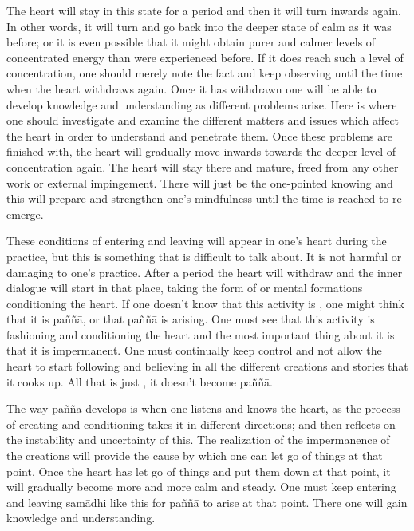 The heart will stay in this state for a period and then it will turn inwards again. In other words, it will turn and go back into the deeper state of calm as it was before; or it is even possible that it might obtain purer and calmer levels of concentrated energy than were experienced before. If it does reach such a level of concentration, one should merely note the fact and keep observing until the time when the heart withdraws again. Once it has withdrawn one will be able to develop knowledge and understanding as different problems arise. Here is where one should investigate and examine the different matters and issues which affect the heart in order to understand and penetrate them. Once these problems are finished with, the heart will gradually move inwards towards the deeper level of concentration again. The heart will stay there and mature, freed from any other work or external impingement. There will just be the one-pointed knowing and this will prepare and strengthen one's mindfulness  until the time is reached to re-emerge.

These conditions of entering and leaving will appear in one's heart during the practice, but this is something that is difficult to talk about. It is not harmful or damaging to one's practice. After a period the heart will withdraw and the inner dialogue will start in that place, taking the form of  or mental formations conditioning the heart. If one doesn't know that this activity is , one might think that it is pa\~n\~n\=a, or that pa\~n\~n\=a is arising. One must see that this activity is fashioning and conditioning the heart and the most important thing about it is that it is impermanent. One must continually keep control and not allow the heart to start following and believing in all the different creations and stories that it cooks up. All that is just , it doesn't become pa\~n\~n\=a.

The way pa\~n\~n\=a develops is when one listens and knows the heart, as the process of creating and conditioning takes it in different directions; and then reflects on the instability and uncertainty of this. The realization of the impermanence of the creations will provide the cause by which one can let go of things at that point. Once the heart has let go of things and put them down at that point, it will gradually become more and more calm and steady. One must keep entering and leaving sam\=adhi like this for pa\~n\~n\=a to arise at that point. There one will gain knowledge and understanding.

